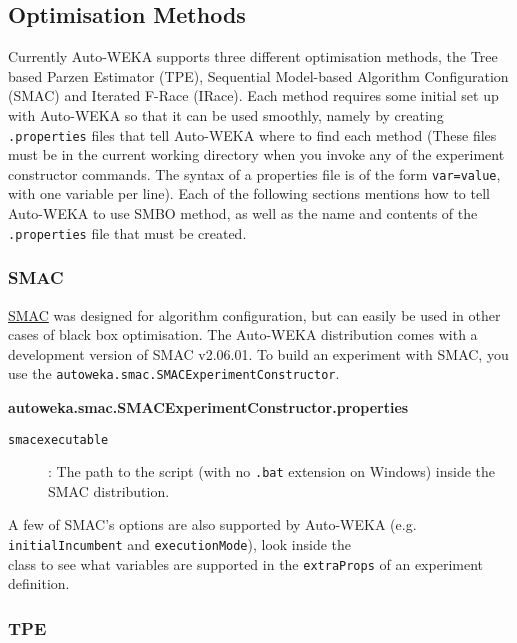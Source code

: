 \subsection{Optimisation Methods}\label{sec:smbo}

Currently Auto-WEKA supports three different optimisation methods, the Tree based Parzen Estimator (TPE), Sequential Model-based Algorithm Configuration (SMAC) and Iterated F-Race (IRace). Each method requires some initial set up with Auto-WEKA so that it can be used smoothly, namely by creating \texttt{.properties} files that tell Auto-WEKA where to find each method (These files must be in the current working directory when you invoke any of the experiment constructor commands. The syntax of a properties file is of the form \texttt{var=value}, with one variable per line). Each of the following sections mentions how to tell Auto-WEKA to use SMBO method, as well as the name and contents of the \texttt{.properties} file that must be created.

\subsubsection{SMAC}

\href{http://www.cs.ubc.ca/labs/beta/Projects/SMAC/}{SMAC} was designed for algorithm configuration, but can easily be used in other cases of black box optimisation. The Auto-WEKA distribution comes with a development version of SMAC v2.06.01. To build an experiment with SMAC, you use the \texttt{autoweka.smac.SMACExperimentConstructor}. 

\textbf{autoweka.smac.SMACExperimentConstructor.properties}
\begin{description}
 \item[\texttt{smacexecutable}]: The path to the  script (with no \texttt{.bat} extension on Windows) inside the SMAC distribution. 
\end{description}

\begin{aside}
A few of SMAC's options are also supported by Auto-WEKA (e.g. \texttt{initialIncumbent} and \texttt{executionMode}), look inside the \\ class to see what variables are supported in the \texttt{extraProps} of an experiment definition.
\end{aside}

\subsubsection{TPE}

